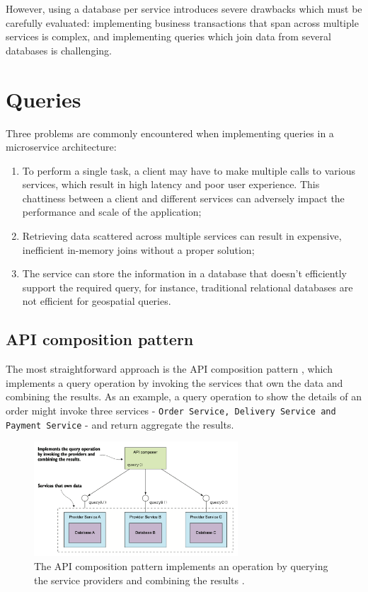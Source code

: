 \documentclass[conference]{IEEEtran}
\begin{document}
However, using a database per service introduces severe drawbacks which must be carefully evaluated: implementing business transactions that span across multiple services is complex, and implementing queries which join data from several databases is challenging.

\section{Queries}

Three problems are commonly encountered when implementing queries in a microservice architecture:

\begin{enumerate}
  \item To perform a single task, a client may have to make multiple calls to various services, which result in high latency and poor user experience. This chattiness between a client and different services can adversely impact the performance and scale of the application;
  \item Retrieving data scattered across multiple services can result in expensive, inefficient in-memory joins without a proper solution;
  \item The service can store the information in a database that doesn't efficiently support the required query, for instance, traditional relational databases are not efficient for geospatial queries.
\end{enumerate}

\subsection{API composition pattern}

The most straightforward approach is the API composition pattern \cite{microservices-patterns-api-composition}, which implements a query operation by invoking the services that own the data and combining the results. As an example, a query operation to show the details of an order might invoke three services - \texttt{Order Service, Delivery Service and Payment Service} - and return aggregate the results.

\begin{figure}[!htbp]
\centering
\includegraphics[width=3in]{jpeg/api-composition}
\caption{The API composition pattern implements an operation by querying the service providers and combining the results \cite{microservices-patterns-api-composition}.}
\label{api-composition}
\end{figure}
\end{document}
